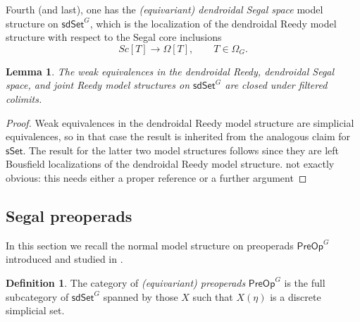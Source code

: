 \documentclass[a4paper,10pt
,draft
]{article}%
\numberwithin{equation}{section}
\numberwithin{figure}{section}
\newtheorem{lemma}[equation]{Lemma}%
\theoremstyle{definition} %
\newtheorem{definition}[equation]{Definition}%
\newcommand{\longto}{\longrightarrow}%
\newcommand{\1}{\ensuremath{\mathbbm 1}}%
\begin{document}
Fourth (and last), one has the \textit{(equivariant) dendroidal Segal space} model structure on $\mathsf{sdSet}^G$,
which is the localization of the dendroidal Reedy model structure with respect to the Segal core inclusions
\[
	Sc[T] \longto \Omega[T],
\qquad
	T \in \Omega_G.
\]



\begin{lemma}\label{FCOLIM_WE_LEM}
	The weak equivalences in the dendroidal Reedy, dendroidal Segal space, and joint Reedy model structures 
	on $\mathsf{sdSet}^G$ are closed under filtered colimits.
\end{lemma}

\begin{proof}
	Weak equivalences in the dendroidal Reedy model structure are simplicial equivalences, 
	so in that case the result is inherited from the analogous claim for $\mathsf{sSet}$.
%	
	The result for the latter two model structures follows
	since they are left Bousfield localizations of the dendroidal Reedy model structure.
	{\color{red} not exactly obvious: this needs either a proper reference or a further argument}
\end{proof}






\subsection{Segal preoperads}
\label{SPREOP_SEC}


In this section we recall the normal model structure on preoperads
$\mathsf{PreOp}^G$
introduced and studied in \cite[\S 4 and \S 5]{BP_edss}.

\begin{definition}\label{PREOP DEF} 
	The category of \textit{(equivariant) preoperads} $\mathsf{PreOp}^G$ is the full subcategory of $\mathsf{sdSet}^G$ spanned by those $X$ such that
	$X(\eta)$ is a discrete simplicial set.
\end{definition}
\end{document}
